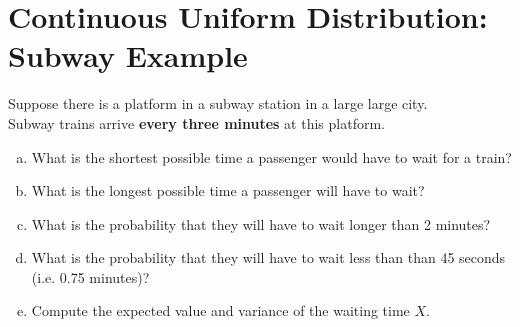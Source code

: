 \documentclass[a4paper,12pt]{article}
\begin{document}
\section*{Continuous Uniform Distribution: Subway Example}
Suppose there is a platform in a subway station in a large large city.  \\ Subway trains arrive \textbf{every three minutes} at this platform.
\begin{enumerate}[(a)]
\item   What is the shortest possible time a passenger would have to wait for a train?
\item What is the longest possible time a passenger will have to wait?
\item What is the probability that they will have to wait longer than 2 minutes?
\item What is the probability that they will have to wait less than than 45 seconds (i.e. 0.75 minutes)?
\item Compute the expected value and variance of the waiting time $X$.
\end{enumerate}
\end{document}
